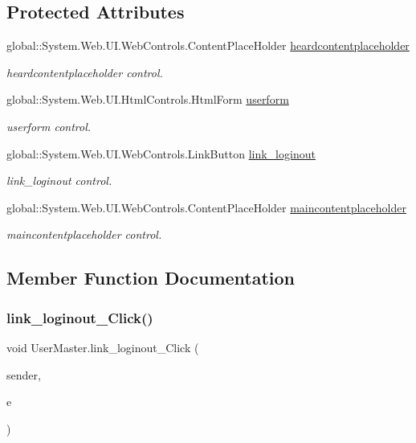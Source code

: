 \subsection*{Protected Attributes}
\begin{DoxyCompactItemize}
\item 
global\+::\+System.\+Web.\+U\+I.\+Web\+Controls.\+Content\+Place\+Holder \mbox{\hyperlink{class_user_master_acadb227855710b24142e70095891121e}{heardcontentplaceholder}}
\begin{DoxyCompactList}\small\item\em heardcontentplaceholder control. \end{DoxyCompactList}\item 
global\+::\+System.\+Web.\+U\+I.\+Html\+Controls.\+Html\+Form \mbox{\hyperlink{class_user_master_a0412aad6b02a04dd269a15662be5eb5e}{userform}}
\begin{DoxyCompactList}\small\item\em userform control. \end{DoxyCompactList}\item 
global\+::\+System.\+Web.\+U\+I.\+Web\+Controls.\+Link\+Button \mbox{\hyperlink{class_user_master_a53d6e767a177eb2d9340a61e112eeeb4}{link\+\_\+loginout}}
\begin{DoxyCompactList}\small\item\em link\+\_\+loginout control. \end{DoxyCompactList}\item 
global\+::\+System.\+Web.\+U\+I.\+Web\+Controls.\+Content\+Place\+Holder \mbox{\hyperlink{class_user_master_a78563de3fceef2e85d68a156326ee54a}{maincontentplaceholder}}
\begin{DoxyCompactList}\small\item\em maincontentplaceholder control. \end{DoxyCompactList}\end{DoxyCompactItemize}


\subsection{Member Function Documentation}
\mbox{\label{class_user_master_abeb36094df51b51f9ce219be80538053}} 
\subsubsection{\texorpdfstring{link\_loginout\_Click()}{link\_loginout\_Click()}}
{\footnotesize\ttfamily void User\+Master.\+link\+\_\+loginout\+\_\+\+Click (\begin{DoxyParamCaption}\item[{object}]{sender,  }\item[{Event\+Args}]{e }\end{DoxyParamCaption})\hspace{0.3cm}{\ttfamily [protected]}}

